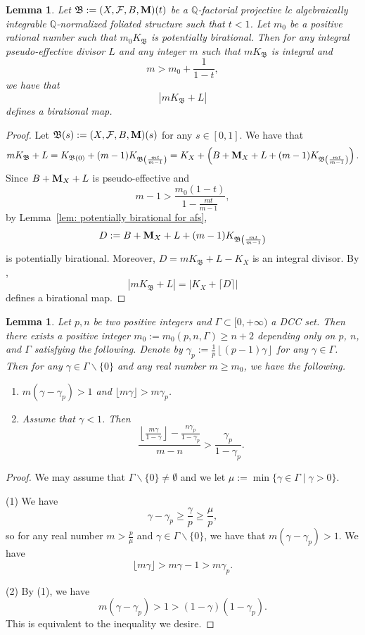 \documentclass[11pt,reqno]{amsart}
\numberwithin{equation}{section}
\newcommand{\Mm}{{\bf{M}}}
\newcommand{\Bb}{{\mathfrak{B}}}
\newcommand{\Ff}{\mathcal{F}}
\newcommand{\Ii}{\Gamma}
\newtheorem{lem}[thm]{Lemma}
\theoremstyle{definition}
\begin{document}
\begin{lem}\label{lem: birational to +pe birational for afs}
Let $\Bb:=(X,\Ff,B,\Mm)(t)$ be a $\mathbb Q$-factorial projective lc algebraically integrable $\mathbb Q$-normalized foliated structure such that $t<1$. Let $m_0$ be a positive rational number such that $m_0K_{\Bb}$ is potentially birational. Then for any integral pseudo-effective divisor $L$ and any integer $m$ such that $mK_{\Bb}$ is integral and 
    $$m>m_0+\frac{1}{1-t},$$
    we have that
    $$|mK_{\Bb}+L|$$
    defines a birational map.
\end{lem}
\begin{proof}
Let $\Bb(s):=(X,\Ff,B,\Mm)(s)$ for any $s\in [0,1]$. We have that 
$$mK_{\Bb}+L=K_{\Bb(0)}+(m-1)K_{\Bb\left(\frac{mt}{m-1}\right)}=K_X+\left(B+\Mm_X+L+(m-1)K_{\Bb\left(\frac{mt}{m-1}\right)}\right).$$
Since $B+\Mm_X+L$ is pseudo-effective and
$$m-1>\frac{m_0(1-t)}{1-\frac{mt}{m-1}},$$
by Lemma~\ref{lem: potentially birational for afs},
$$D:=B+\Mm_X+L+(m-1)K_{\Bb\left(\frac{mt}{m-1}\right)}$$
is potentially birational. Moreover, $D=mK_{\Bb}+L-K_X$ is an integral divisor. By \cite[Lemma~2.3.4]{HMX13}, 
$$|mK_{\Bb}+L|=|K_X+\lceil D\rceil|$$
defines a birational map.
\end{proof}

\begin{lem}\label{lem: elementary perturbation eb}
Let $p,n$ be two positive integers and $\Ii\subset [0,+\infty)$ a DCC set. Then there exists a positive integer $m_0:=m_0(p,n,\Ii)\geq n+2$ depending only on $p$, $n$, and $\Ii$ satisfying the following. Denote by $\gamma_p:=\frac{1}{p}\left\lfloor (p-1)\gamma\right\rfloor$ for any $\gamma\in\Ii$. Then for any $\gamma\in\Ii\backslash\{0\}$ and any real number $m\geq m_0$, we have the following.
    \begin{enumerate}
    \item $m(\gamma-\gamma_p)>1$ and $\lfloor m\gamma\rfloor>m\gamma_p$.
        \item Assume that $\gamma<1$. Then
        $$\frac{\left\lfloor\frac{m\gamma}{1-\gamma}\right\rfloor-\frac{n\gamma_p}{1-\gamma_p}}{m-n}>\frac{\gamma_p}{1-\gamma_p}.$$    \end{enumerate}
\end{lem}
\begin{proof}
We may assume that $\Ii\backslash\{0\}\neq\emptyset$ and we let $\mu:=\min\{\gamma\in\Ii\mid \gamma>0\}$.

(1) We have 
$$\gamma-\gamma_p\geq\frac{\gamma}{p}\geq\frac{\mu}{p},$$
so for any real number $m>\frac{p}{\mu}$ and $\gamma\in\Ii\backslash\{0\}$, we have that $m(\gamma-\gamma_p)>1$. We have
$$\lfloor m\gamma\rfloor>m\gamma-1>m\gamma_p.$$

(2) By (1), we have
$$m(\gamma-\gamma_p)>1>(1-\gamma)(1-\gamma_p).$$
This is equivalent to the inequality we desire.
\end{proof}
\end{document}
